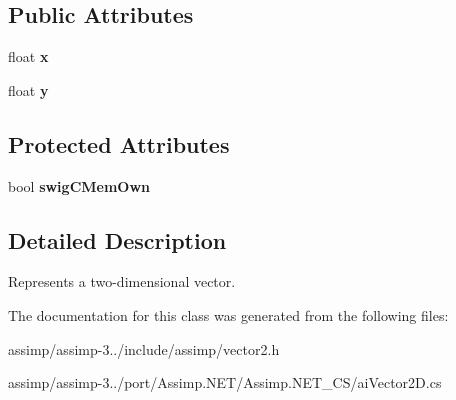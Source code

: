 \subsection*{Public Attributes}
\begin{DoxyCompactItemize}
\item 
\hypertarget{structai_vector2_d_a968e4db235e054f58b4c320576d82740}{float {\bfseries x}}\label{structai_vector2_d_a968e4db235e054f58b4c320576d82740}

\item 
\hypertarget{structai_vector2_d_a7bb1686f941459496627a3b8ce68e73f}{float {\bfseries y}}\label{structai_vector2_d_a7bb1686f941459496627a3b8ce68e73f}

\end{DoxyCompactItemize}
\subsection*{Protected Attributes}
\begin{DoxyCompactItemize}
\item 
\hypertarget{structai_vector2_d_a1a2d8172d11c05ab86abb2ec1190ea48}{bool {\bfseries swig\+C\+Mem\+Own}}\label{structai_vector2_d_a1a2d8172d11c05ab86abb2ec1190ea48}

\end{DoxyCompactItemize}


\subsection{Detailed Description}
Represents a two-\/dimensional vector. 

The documentation for this class was generated from the following files\+:\begin{DoxyCompactItemize}
\item 
assimp/assimp-\/3../include/assimp/vector2.\+h\item 
assimp/assimp-\/3../port/\+Assimp.\+N\+E\+T/\+Assimp.\+N\+E\+T\+\_\+\+C\+S/ai\+Vector2\+D.\+cs\end{DoxyCompactItemize}

